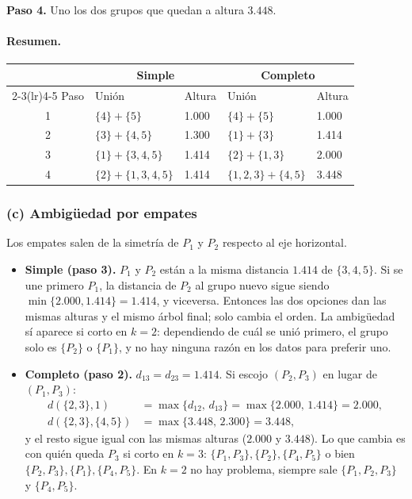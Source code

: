 \documentclass[11pt]{article}\usepackage[]{graphicx}\usepackage[]{xcolor}
\begin{document}
\textbf{Paso 4.} Uno los dos grupos que quedan a altura $3.448$.

\paragraph{Resumen.}

\begin{table}[H]
\centering
\begin{tabular}{c ll ll}
\toprule
 & \multicolumn{2}{c}{Simple} & \multicolumn{2}{c}{Completo}\\
\cmidrule(lr){2-3}\cmidrule(lr){4-5}
Paso & Unión & Altura & Unión & Altura\\
\midrule
1 & $\{4\}+\{5\}$ & 1.000 & $\{4\}+\{5\}$ & 1.000\\
2 & $\{3\}+\{4,5\}$ & 1.300 & $\{1\}+\{3\}$ & 1.414\\
3 & $\{1\}+\{3,4,5\}$ & 1.414 & $\{2\}+\{1,3\}$ & 2.000\\
4 & $\{2\}+\{1,3,4,5\}$ & 1.414 & $\{1,2,3\}+\{4,5\}$ & 3.448\\
\bottomrule
\end{tabular}
\end{table}

\subsubsection*{(c) Ambigüedad por empates}

Los empates salen de la simetría de $P_1$ y $P_2$ respecto al eje horizontal.

\begin{itemize}[leftmargin=*]
\item \textbf{Simple (paso 3).} $P_1$ y $P_2$ están a la misma distancia $1.414$ de $\{3,4,5\}$. Si se une primero $P_1$, la distancia de $P_2$ al grupo nuevo sigue siendo $\min\{2.000, 1.414\}=1.414$, y viceversa. Entonces las dos opciones dan las mismas alturas y el mismo árbol final; solo cambia el orden. La ambigüedad sí aparece si corto en $k=2$: dependiendo de cuál se unió primero, el grupo solo es $\{P_2\}$ o $\{P_1\}$, y no hay ninguna razón en los datos para preferir uno.
\item \textbf{Completo (paso 2).} $d_{13} = d_{23} = 1.414$. Si escojo $(P_2,P_3)$ en lugar de $(P_1,P_3)$:
\begin{align*}
d(\{2,3\}, 1) &= \max\{d_{12},\, d_{13}\} = \max\{2.000,\, 1.414\} = 2.000,\\
d(\{2,3\}, \{4,5\}) &= \max\{3.448,\, 2.300\} = 3.448,
\end{align*}
y el resto sigue igual con las mismas alturas ($2.000$ y $3.448$). Lo que cambia es con quién queda $P_3$ si corto en $k=3$: $\{P_1,P_3\},\{P_2\},\{P_4,P_5\}$ o bien $\{P_2,P_3\},\{P_1\},\{P_4,P_5\}$. En $k=2$ no hay problema, siempre sale $\{P_1,P_2,P_3\}$ y $\{P_4,P_5\}$.
\end{itemize}
\end{document}
